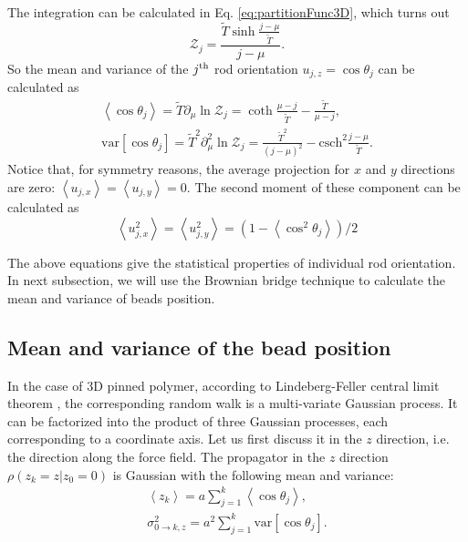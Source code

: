 The integration can be calculated in Eq. \eqref{eq:partitionFunc3D}, which turns out
\begin{equation}
    \label{eq:partitionFuncRod}
    \mathcal{Z}_j = \frac{\tilde{T}\sinh\frac{j-\mu}{\tilde{T}}}{j - \mu}.
\end{equation}
So the mean and variance of the $j^{\rm{th}}$ rod orientation $u_{j,z} = \cos\theta_j$ can be calculated as
\begin{equation}
    \begin{aligned}
    \label{eq:meanVarRod}
    \left<\cos\theta_j\right> = \tilde{T}\partial_{\mu}\ln\mathcal{Z}_j = \coth\frac{\mu - j}{\tilde{T}}-\frac{\tilde{T}}{\mu-j}, \\
    \text{var}\left[\cos\theta_j\right] = \tilde{T}^2\partial_{\mu}^2\ln\mathcal{Z}_j = \frac{\tilde{T}^2}{(j-\mu)^2} - \text{csch}^2\frac{j-\mu}{\tilde{T}}.
    \end{aligned}
\end{equation}
Notice that, for symmetry reasons, the average projection for $x$ and $y$ directions are zero: $\left<u_{j,x}\right> = \left<u_{j,y}\right> = 0$. The second moment of these component can be calculated as
\begin{equation}
    \label{eq:second_moment}
    \left<u_{j,x}^2\right> = \left<u_{j,y}^2\right> = (1-\left<\cos^2\theta_j\right>)/2
\end{equation}

The above equations give the statistical properties of individual rod orientation. In next subsection, we will use the Brownian bridge technique to calculate the mean and variance of beads position.

\subsection{Mean and variance of the bead position}
\label{sub:mean_and_variance_of_bead_position}
In the case of 3D pinned polymer, according to Lindeberg-Feller central limit theorem \cite{Feller2008,Athreya2006}, the corresponding random walk is a multi-variate Gaussian process. It can be factorized into the product of three Gaussian processes, each corresponding to a coordinate axis. Let us first discuss it in the $z$ direction, i.e. the direction along the force field. The propagator in the $z$ direction $\rho(z_k = z| z_0 = 0)$ is Gaussian with the following mean and variance:
\begin{equation}
    \begin{aligned}
    \label{eq:meanVarRod3D}
    \left<z_k\right> = a\sum_{j=1}^k\left<\cos\theta_j\right>, \\
    \sigma_{0 \rightarrow k,z}^2 = a^2\sum_{j=1}^k\text{var}\left[\cos\theta_j\right].
    \end{aligned}
\end{equation}

